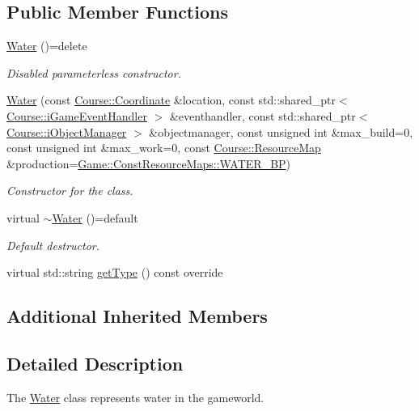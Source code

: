 \subsection*{Public Member Functions}
\begin{DoxyCompactItemize}
\item 
\hyperlink{classGame_1_1Water_a2f2918f6deef57b3e96ee63221002fee}{Water} ()=delete
\begin{DoxyCompactList}\small\item\em Disabled parameterless constructor. \end{DoxyCompactList}\item 
\hyperlink{classGame_1_1Water_a970774392539357ca258286489d9e679}{Water} (const \hyperlink{classCourse_1_1Coordinate}{Course\-::\-Coordinate} \&location, const std\-::shared\-\_\-ptr$<$ \hyperlink{classCourse_1_1iGameEventHandler}{Course\-::i\-Game\-Event\-Handler} $>$ \&eventhandler, const std\-::shared\-\_\-ptr$<$ \hyperlink{classCourse_1_1iObjectManager}{Course\-::i\-Object\-Manager} $>$ \&objectmanager, const unsigned int \&max\-\_\-build=0, const unsigned int \&max\-\_\-work=0, const \hyperlink{namespaceCourse_ab9a46ed9cd00485e318e5731ea2f78d9}{Course\-::\-Resource\-Map} \&production=\hyperlink{namespaceGame_1_1ConstResourceMaps_a0a964a6f0f80340d5a2d5a0a8dd0f79a}{Game\-::\-Const\-Resource\-Maps\-::\-W\-A\-T\-E\-R\-\_\-\-B\-P})
\begin{DoxyCompactList}\small\item\em Constructor for the class. \end{DoxyCompactList}\item 
virtual \hyperlink{classGame_1_1Water_ad714f7f3fd31960b7970e670070975f4}{$\sim$\-Water} ()=default
\begin{DoxyCompactList}\small\item\em Default destructor. \end{DoxyCompactList}\item 
virtual std\-::string \hyperlink{classGame_1_1Water_ab45fa1bb08eb0893d7bec1a97e7b22f0}{get\-Type} () const override
\end{DoxyCompactItemize}
\subsection*{Additional Inherited Members}


\subsection{Detailed Description}
The \hyperlink{classGame_1_1Water}{Water} class represents water in the gameworld. 

